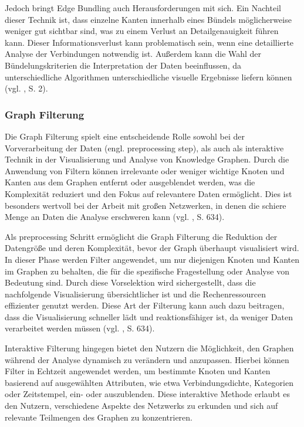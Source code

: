 Jedoch bringt Edge Bundling auch Herausforderungen mit sich. Ein Nachteil dieser Technik ist, dass einzelne Kanten innerhalb eines Bündels möglicherweise weniger gut sichtbar sind, was zu einem Verlust an Detailgenauigkeit führen kann. Dieser Informationsverlust kann problematisch sein, wenn eine detaillierte Analyse der Verbindungen notwendig ist. Außerdem kann die Wahl der Bündelungskriterien die Interpretation der Daten beeinflussen, da unterschiedliche Algorithmen unterschiedliche visuelle Ergebnisse liefern können (vgl. \cite{edgeBundling:Holten}, S. 2).

\subsubsection{Graph Filterung}

Die Graph Filterung spielt eine entscheidende Rolle sowohl bei der Vorverarbeitung der Daten (engl. preprocessing step), als auch als interaktive Technik in der Visualisierung und Analyse von Knowledge Graphen. Durch die Anwendung von Filtern können irrelevante oder weniger wichtige Knoten und Kanten aus dem Graphen entfernt oder ausgeblendet werden, was die Komplexität reduziert und den Fokus auf relevantere Daten ermöglicht. Dies ist besonders wertvoll bei der Arbeit mit großen Netzwerken, in denen die schiere Menge an Daten die Analyse erschweren kann (vgl. \cite{chen:SurveyGraphVisualization}, S. 634).

Als preprocessing Schritt ermöglicht die Graph Filterung die Reduktion der Datengröße und deren Komplexität, bevor der Graph überhaupt visualisiert wird. In dieser Phase werden Filter angewendet, um nur diejenigen Knoten und Kanten im Graphen zu behalten, die für die spezifische Fragestellung oder Analyse von Bedeutung sind. Durch diese Vorselektion wird sichergestellt, dass die nachfolgende Visualisierung übersichtlicher ist und die Rechenressourcen effizienter genutzt werden. Diese Art der Filterung kann auch dazu beitragen, dass die Visualisierung schneller lädt und reaktionsfähiger ist, da weniger Daten verarbeitet werden müssen (vgl. \cite{chen:SurveyGraphVisualization}, S. 634).

Interaktive Filterung hingegen bietet den Nutzern die Möglichkeit, den Graphen während der Analyse dynamisch zu verändern und anzupassen. Hierbei können Filter in Echtzeit angewendet werden, um bestimmte Knoten und Kanten basierend auf ausgewählten Attributen, wie etwa Verbindungsdichte, Kategorien oder Zeitstempel, ein- oder auszublenden. Diese interaktive Methode erlaubt es den Nutzern, verschiedene Aspekte des Netzwerks zu erkunden und sich auf relevante Teilmengen des Graphen zu konzentrieren.

